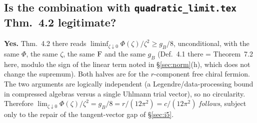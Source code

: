 \documentclass[11pt]{article}
\begin{document}
\subsection{Is the combination with \texttt{quadratic\_limit.tex} Thm.~4.2 legitimate?}
\textbf{Yes.}  Thm.~4.2 there reads $\liminf_{\zeta\downarrow0}\Phi(\zeta)/\zeta^2\ge g_B/8$,
unconditional, with the same $\Phi$, the same $\zeta$, the same $\operatorname{F}$ and the same $g_B$
(Def.~4.1 there = Theorem~7.2 here, modulo the sign of the linear term noted in \S\ref{sec:norm}(h),
which does not change the supremum).  Both halves are for the $r$-component free chiral fermion.
The two arguments are logically independent (a Legendre/data-processing bound in compressed algebras
versus a single Uhlmann trial vector), so no circularity.  Therefore
$\lim_{\zeta\downarrow0}\Phi(\zeta)/\zeta^2=g_B/8=r/(12\pi^2)=c/(12\pi^2)$ \emph{follows}, subject
only to the repair of the tangent-vector gap of \S\ref{sec:i5}.
\end{document}
